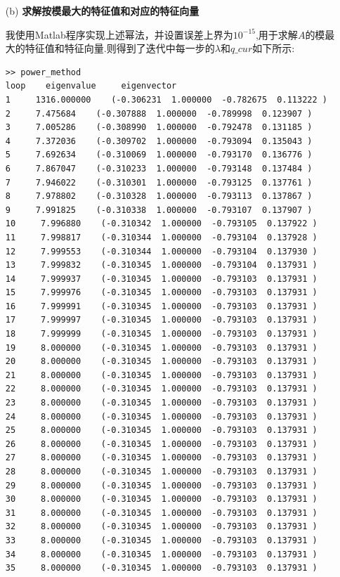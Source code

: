 \documentclass[12pt,a4paper,utf8]{ctexart}
\begin{document}
\begin{enumerate}
\begin{itemize}
    \item[(b)] \textbf{求解按模最大的特征值和对应的特征向量}
    \par
    我使用Matlab程序实现上述幂法，并设置误差上界为$10^{-15}$,用于求解$A$的模最大的特征值和特征向量.则得到了迭代中每一步的$\lambda$和$q\_cur$如下所示:
    \begin{lstlisting}
>> power_method
loop    eigenvalue     eigenvector
1     1316.000000    (-0.306231  1.000000  -0.782675  0.113222 )
2     7.475684    (-0.307888  1.000000  -0.789998  0.123907 )
3     7.005286    (-0.308990  1.000000  -0.792478  0.131185 )
4     7.372036    (-0.309702  1.000000  -0.793094  0.135043 )
5     7.692634    (-0.310069  1.000000  -0.793170  0.136776 )
6     7.867047    (-0.310233  1.000000  -0.793148  0.137484 )
7     7.946022    (-0.310301  1.000000  -0.793125  0.137761 )
8     7.978802    (-0.310328  1.000000  -0.793113  0.137867 )
9     7.991825    (-0.310338  1.000000  -0.793107  0.137907 )
10     7.996880    (-0.310342  1.000000  -0.793105  0.137922 )
11     7.998817    (-0.310344  1.000000  -0.793104  0.137928 )
12     7.999553    (-0.310344  1.000000  -0.793104  0.137930 )
13     7.999832    (-0.310345  1.000000  -0.793104  0.137931 )
14     7.999937    (-0.310345  1.000000  -0.793103  0.137931 )
15     7.999976    (-0.310345  1.000000  -0.793103  0.137931 )
16     7.999991    (-0.310345  1.000000  -0.793103  0.137931 )
17     7.999997    (-0.310345  1.000000  -0.793103  0.137931 )
18     7.999999    (-0.310345  1.000000  -0.793103  0.137931 )
19     8.000000    (-0.310345  1.000000  -0.793103  0.137931 )
20     8.000000    (-0.310345  1.000000  -0.793103  0.137931 )
21     8.000000    (-0.310345  1.000000  -0.793103  0.137931 )
22     8.000000    (-0.310345  1.000000  -0.793103  0.137931 )
23     8.000000    (-0.310345  1.000000  -0.793103  0.137931 )
24     8.000000    (-0.310345  1.000000  -0.793103  0.137931 )
25     8.000000    (-0.310345  1.000000  -0.793103  0.137931 )
26     8.000000    (-0.310345  1.000000  -0.793103  0.137931 )
27     8.000000    (-0.310345  1.000000  -0.793103  0.137931 )
28     8.000000    (-0.310345  1.000000  -0.793103  0.137931 )
29     8.000000    (-0.310345  1.000000  -0.793103  0.137931 )
30     8.000000    (-0.310345  1.000000  -0.793103  0.137931 )
31     8.000000    (-0.310345  1.000000  -0.793103  0.137931 )
32     8.000000    (-0.310345  1.000000  -0.793103  0.137931 )
33     8.000000    (-0.310345  1.000000  -0.793103  0.137931 )
34     8.000000    (-0.310345  1.000000  -0.793103  0.137931 )
35     8.000000    (-0.310345  1.000000  -0.793103  0.137931 )


\end{lstlisting}
\end{itemize}
\end{enumerate}
\end{document}
